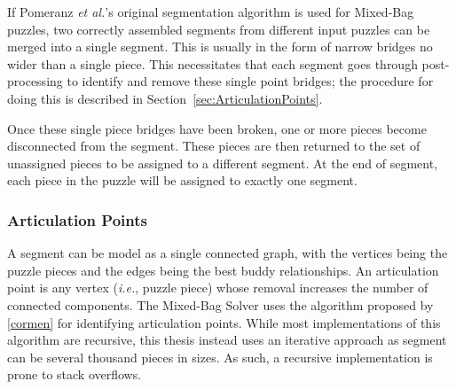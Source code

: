 If Pomeranz \textit{et al.}'s original segmentation algorithm is used for Mixed-Bag puzzles, two correctly assembled segments from different input puzzles can be merged into a single segment.  This is usually in the form of narrow bridges no wider than a single piece. This necessitates that each segment goes through post-processing to identify and remove these single point bridges; the procedure for doing this is described in Section~\ref{sec:ArticulationPoints}.  

Once these single piece bridges have been broken, one or more pieces become disconnected from the segment.  These pieces are then returned to the set of unassigned pieces to be assigned to a different segment.  At the end of segment, each piece in the puzzle will be assigned to exactly one segment.

\subsubsection{Articulation Points}\label{sec:segmentPuzzle}

A segment can be model as a single connected graph, with the vertices being the puzzle pieces and the edges being the best buddy relationships.  An articulation point is any vertex (\textit{i.e.}, puzzle piece) whose removal increases the number of connected components.  The Mixed-Bag Solver uses the algorithm proposed by \ref{cormen} for identifying articulation points.  While most implementations of this algorithm are recursive, this thesis instead uses an iterative approach as segment can be several thousand pieces in sizes.  As such, a recursive implementation is prone to stack overflows.

